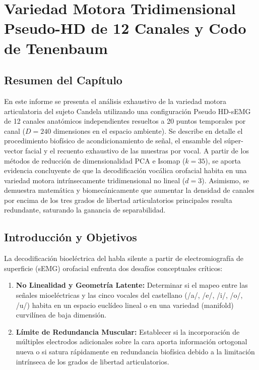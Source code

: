 \documentclass[11pt,a4paper,openany]{book}
\theoremstyle{definition}
\begin{document}
\chapter{Variedad Motora Tridimensional Pseudo-HD de 12 Canales y Codo de Tenenbaum}
\label{chap:pseudo_hd_12ch}



\section*{Resumen del Capítulo}
En este informe se presenta el análisis exhaustivo de la variedad motora articulatoria del sujeto Candela utilizando una configuración Pseudo HD-sEMG de 12 canales anatómicos independientes resueltos a 20 puntos temporales por canal ($D = 240$ dimensiones en el espacio ambiente). Se describe en detalle el procedimiento biofísico de acondicionamiento de señal, el ensamble del súper-vector facial y el recuento exhaustivo de las muestras por vocal. A partir de los métodos de reducción de dimensionalidad PCA e Isomap ($k=35$), se aporta evidencia concluyente de que la decodificación vocálica orofacial habita en una variedad motora intrínsecamente tridimensional no lineal ($d=3$). Asimismo, se demuestra matemática y biomecánicamente que aumentar la densidad de canales por encima de los tres grados de libertad articulatorios principales resulta redundante, saturando la ganancia de separabilidad.


\section{Introducción y Objetivos}

La decodificación bioeléctrica del habla silente a partir de electromiografía de superficie (sEMG) orofacial enfrenta dos desafíos conceptuales críticos:
\begin{enumerate}
    \item \textbf{No Linealidad y Geometría Latente:} Determinar si el mapeo entre las señales mioeléctricas y las cinco vocales del castellano (/a/, /e/, /i/, /o/, /u/) habita en un espacio euclídeo lineal o en una variedad (manifold) curvilínea de baja dimensión.
    \item \textbf{Límite de Redundancia Muscular:} Establecer si la incorporación de múltiples electrodos adicionales sobre la cara aporta información ortogonal nueva o si satura rápidamente en redundancia biofísica debido a la limitación intrínseca de los grados de libertad articulatorios.
\end{enumerate}
\end{document}
